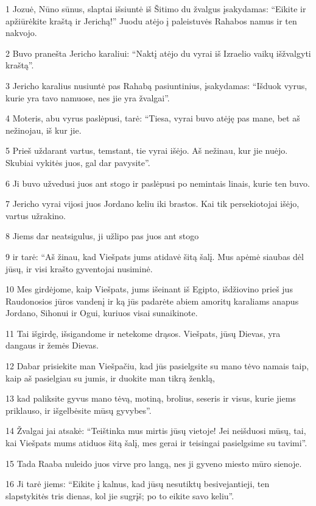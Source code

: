 \par 1 Jozuė, Nūno sūnus, slaptai išsiuntė iš Šitimo du žvalgus įsakydamas: “Eikite ir apžiūrėkite kraštą ir Jerichą!” Juodu atėjo į paleistuvės Rahabos namus ir ten nakvojo. 
\par 2 Buvo pranešta Jericho karaliui: “Naktį atėjo du vyrai iš Izraelio vaikų išžvalgyti kraštą”. 
\par 3 Jericho karalius nusiuntė pas Rahabą pasiuntinius, įsakydamas: “Išduok vyrus, kurie yra tavo namuose, nes jie yra žvalgai”. 
\par 4 Moteris, abu vyrus paslėpusi, tarė: “Tiesa, vyrai buvo atėję pas mane, bet aš nežinojau, iš kur jie. 
\par 5 Prieš uždarant vartus, temstant, tie vyrai išėjo. Aš nežinau, kur jie nuėjo. Skubiai vykitės juos, gal dar pavysite”. 
\par 6 Ji buvo užvedusi juos ant stogo ir paslėpusi po nemintais linais, kurie ten buvo. 
\par 7 Jericho vyrai vijosi juos Jordano keliu iki brastos. Kai tik persekiotojai išėjo, vartus užrakino. 
\par 8 Jiems dar neatsigulus, ji užlipo pas juos ant stogo 
\par 9 ir tarė: “Aš žinau, kad Viešpats jums atidavė šitą šalį. Mus apėmė siaubas dėl jūsų, ir visi krašto gyventojai nusiminė. 
\par 10 Mes girdėjome, kaip Viešpats, jums išeinant iš Egipto, išdžiovino prieš jus Raudonosios jūros vandenį ir ką jūs padarėte abiem amoritų karaliams anapus Jordano, Sihonui ir Ogui, kuriuos visai sunaikinote. 
\par 11 Tai išgirdę, išsigandome ir netekome drąsos. Viešpats, jūsų Dievas, yra dangaus ir žemės Dievas. 
\par 12 Dabar prisiekite man Viešpačiu, kad jūs pasielgsite su mano tėvo namais taip, kaip aš pasielgiau su jumis, ir duokite man tikrą ženklą, 
\par 13 kad paliksite gyvus mano tėvą, motiną, brolius, seseris ir visus, kurie jiems priklauso, ir išgelbėsite mūsų gyvybes”. 
\par 14 Žvalgai jai atsakė: “Teištinka mus mirtis jūsų vietoje! Jei neišduosi mūsų, tai, kai Viešpats mums atiduos šitą šalį, mes gerai ir teisingai pasielgsime su tavimi”. 
\par 15 Tada Raaba nuleido juos virve pro langą, nes ji gyveno miesto mūro sienoje. 
\par 16 Ji tarė jiems: “Eikite į kalnus, kad jūsų nesutiktų besivejantieji, ten slapstykitės tris dienas, kol jie sugrįš; po to eikite savo keliu”. 
